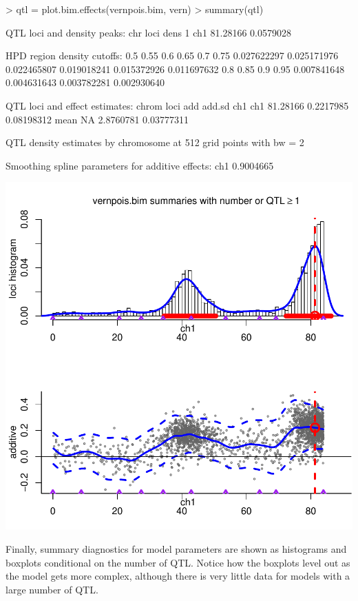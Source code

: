 \documentclass{article}
\begin{document}
\begin{Schunk}
\begin{Sinput}
> qtl = plot.bim.effects(vernpois.bim, vern)
> summary(qtl)
\end{Sinput}
\begin{Soutput}
QTL loci and density peaks:
  chr     loci      dens
1 ch1 81.28166 0.0579028

HPD region density cutoffs:
        0.5        0.55         0.6        0.65         0.7        0.75 
0.027622297 0.025171976 0.022465807 0.019018241 0.015372926 0.011697632 
        0.8        0.85         0.9        0.95 
0.007841648 0.004631643 0.003782281 0.002930640 

QTL loci and effect estimates:
    chrom     loci       add     add.sd
ch1   ch1 81.28166 0.2217985 0.08198312
     mean       NA 2.8760781 0.03777311

QTL density estimates by chromosome at 512 grid points with bw = 2 

Smoothing spline parameters for additive effects:
      ch1 
0.9004665 
\end{Soutput}
\end{Schunk}
\includegraphics{bim_summary-008}

Finally, summary diagnostics for model parameters are shown as
histograms and boxplots conditional on the number of QTL. Notice how
the boxplots level out as the model gets more complex, although there
is very little data for models with a large number of QTL.
\end{document}
